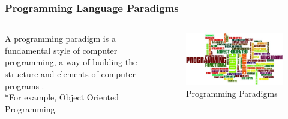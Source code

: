 \documentclass[aspectratio=1610]{beamer}
\begin{document}
\begin{frame}
\frametitle{Programming Language Paradigms}
  \begin{columns}[T]
    \begin{column}{.4\textwidth}
     \begin{block}{}
A programming paradigm is a fundamental style of computer programming, a way of building the structure and elements of computer programs \cite{progparawiki}.
\\*For example, Object Oriented Programming.
    \end{block}
    \end{column}
    \begin{column}{.6\textwidth}
    \begin{block}{}
\begin{figure}
    \includegraphics[width=1.1\textwidth]{programminglanguageparadigms.jpg} 
    \caption{Programming Paradigms \cite{progparawiki, progparawordle}}
 \end{figure}   
    \end{block}
    \end{column}
  \end{columns}
\end{frame}

\end{document}
